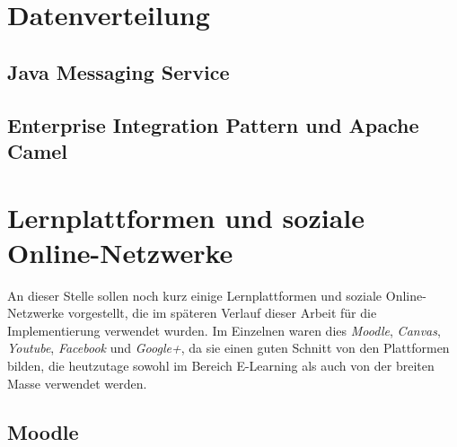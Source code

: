

\section{Datenverteilung} %
\label{sec:datenverteilung}

\subsection{Java Messaging Service} %
\label{sub:java_messaging_service}


\subsection{Enterprise Integration Pattern und Apache Camel} %
\label{sub:enterprise_integration_pattern_und_apache_camel}




\section{Lernplattformen und soziale Online-Netzwerke} %
\label{sec:lernplattformen_und_soziale_online_netzwerke}

An dieser Stelle sollen noch kurz einige Lernplattformen und soziale Online-Netzwerke vorgestellt, die im späteren Verlauf dieser Arbeit für die Implementierung verwendet wurden. Im Einzelnen waren dies \emph{Moodle}, \emph{Canvas}, \emph{Youtube}, \emph{Facebook} und \emph{Google+}, da sie einen guten Schnitt von den Plattformen bilden, die heutzutage sowohl im Bereich E-Learning als auch von der breiten Masse verwendet werden.


\subsection{Moodle} %
\label{sub:moodle}

